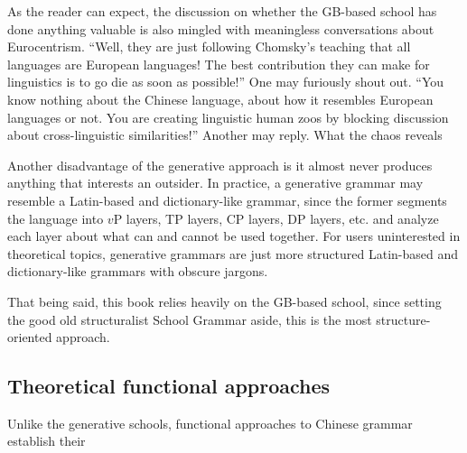 As the reader can expect, the discussion on whether the GB-based school has done anything valuable 
is also mingled with meaningless conversations about Eurocentrism. ``Well, they are just following 
Chomsky's teaching that all languages are European languages! The best contribution they can make for 
linguistics is to go die as soon as possible!'' One may furiously shout out. ``You know nothing about 
the Chinese language, about how it resembles European languages or not. You are creating linguistic 
human zoos by blocking discussion about cross-linguistic similarities!'' Another may reply.
What the chaos reveals %

Another disadvantage of the generative approach is it almost never produces anything that interests an outsider.
In practice, a generative grammar may resemble a Latin-based and dictionary-like grammar, since the former 
segments the language into $v$P layers, TP layers, CP layers, DP layers, etc. and analyze each layer 
about what can and cannot be used together. For users uninterested in theoretical topics,
generative grammars are just more structured Latin-based and dictionary-like grammars with obscure jargons.

That being said, this book relies heavily on the GB-based school, since setting the good old structuralist
School Grammar aside, this is the most structure-oriented approach.

\subsection{Theoretical functional approaches}

Unlike the generative schools, functional approaches to Chinese grammar establish their 
